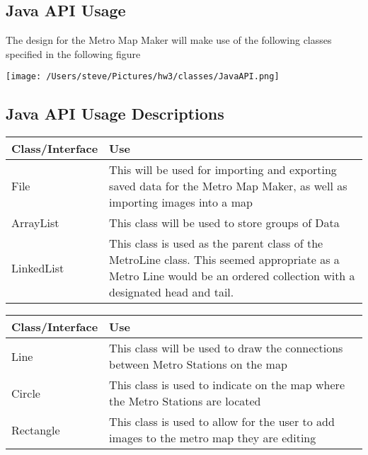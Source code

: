 \documentclass[10pt,a4paper]{article}
\begin{document}
\subsection{Java API Usage}
The design for the Metro Map Maker will make use of the following classes specified in the following figure

\begin{center}
\texttt{[image: /Users/steve/Pictures/hw3/classes/JavaAPI.png]}
\end{center}

\subsection{Java API Usage Descriptions}

\begin{center}
\begin{tabular}{| l | p{12cm} |}
\hline
Class/Interface & Use \\ \hline
File & This will be used for importing and exporting saved data for the Metro Map Maker, as well as importing images into a map \\ \hline
ArrayList & This class will be used to store groups of Data\\ \hline
LinkedList & This class is used as the parent class of the MetroLine class. This seemed appropriate as a Metro Line would be an ordered collection with a designated head and tail. \\ \hline
\end{tabular}
\end{center}

\begin{center}
\begin{tabular}{| l | p{12cm} |}
\hline
Class/Interface & Use \\ \hline
Line & This class will be used to draw the connections between Metro Stations on the map \\ \hline
Circle & This class is used to indicate on the map where the Metro Stations are located \\ \hline
Rectangle & This class is used to allow for the user to add images to the metro map they are editing \\ \hline
\end{tabular}
\end{center}
\end{document}
